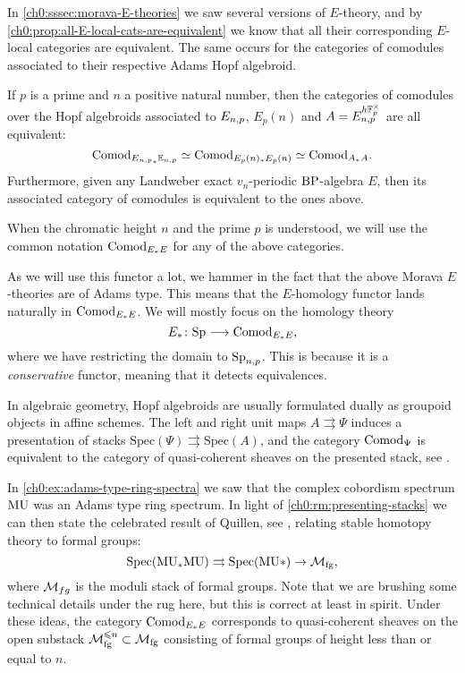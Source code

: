In \cref{ch0:sssec:morava-E-theories} we saw several versions of $E$-theory, and by \cref{ch0:prop:all-E-local-cats-are-equivalent} we know that all their corresponding $E$-local categories are equivalent. The same occurs for the categories of comodules associated to their respective Adams Hopf algebroid.

\begin{proposition}
    If $p$ is a prime and $n$ a positive natural number, then the categories of comodules over the Hopf algebroids associated to $E_{n,p}$, $E_p(n)$ and $A = E_{n,p}^{h\mathbb{F}_p^\times}$ are all equivalent: 
    \[\mathrm{Comod}_{E{_{n,p}}_*\mathbb{E}_{n,p}}\simeq \mathrm{Comod}_{E_p(n)_*E_p(n)}\simeq \mathrm{Comod}_{A_*A}.\]
    Furthermore, given any Landweber exact $v_n$-periodic $\mathrm{BP}$-algebra $E$, then its associated category of comodules is equivalent to the ones above. 
\end{proposition}

\begin{notation}
    When the chromatic height $n$ and the prime $p$ is understood, we will use the common notation $\mathrm{Comod}_{E_*E}$ for any of the above categories. 
\end{notation}

\begin{example}
    \label{ch0:ex:E-homology-functor}
    As we will use this functor a lot, we hammer in the fact that the above Morava $E$-theories are of Adams type. This means that the $E$-homology functor lands naturally in $\mathrm{Comod}_{E_*E}$. We will mostly focus on the homology theory
    \[E_*\colon \mathrm{Sp} \longrightarrow \mathrm{Comod}_{E_*E},\]
    where we have restricting the domain to $\mathrm{Sp}_{n,p}$. This is because it is a \emph{conservative} functor, meaning that it detects equivalences. 
\end{example}

\begin{remark}
    \label{ch0:rm:presenting-stacks}
    In algebraic geometry, Hopf algebroids are usually formulated dually as groupoid objects in affine schemes. The left and right unit maps $A\rightrightarrows \Psi$ induces a presentation of stacks $\mathrm{Spec}(\Psi)\rightrightarrows \mathrm{Spec}(A)$, and the category $\mathrm{Comod}_\Psi$ is equivalent to the category of quasi-coherent sheaves on the presented stack, see \cite[Thm 8]{naumann_07}. 
\end{remark}

\begin{remark}
    In \cref{ch0:ex:adams-type-ring-spectra} we saw that the complex cobordism spectrum $\mathrm{MU}$ was an Adams type ring spectrum. In light of \cref{ch0:rm:presenting-stacks} we can then state the celebrated result of Quillen, see \cite{quillen_1969}, relating stable homotopy theory to formal groups:
    \[\mathrm{Spec}(\mathrm{MU}_*\mathrm{MU})\rightrightarrows \mathrm{Spec}(\mathrm{MU}*)\rightarrow \mathcal{M}_{\mathrm{fg}},\]
    where $\mathcal{M}_{fg}$ is the moduli stack of formal groups. Note that we are brushing some technical details under the rug here, but this is correct at least in spirit. Under these ideas, the category $\mathrm{Comod}_{E_*E}$ corresponds to quasi-coherent sheaves on the open substack $\mathcal{M}_{\mathrm{fg}}^{\leqslant n} \subset \mathcal{M}_{\mathrm{fg}}$ consisting of formal groups of height less than or equal to $n$. 
\end{remark}


